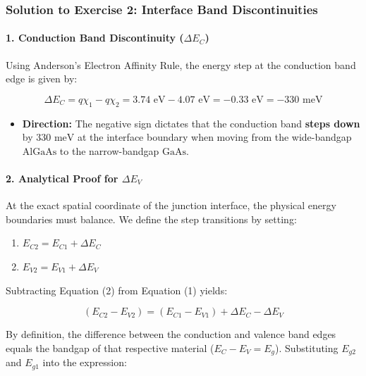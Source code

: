 \documentclass[
]{article}
\providecommand{\tightlist}{%
  \setlength{\itemsep}{0pt}\setlength{\parskip}{0pt}}
\begin{document}
\subsubsection{Solution to Exercise 2: Interface Band
Discontinuities}\label{solution-to-exercise-2-interface-band-discontinuities}

\paragraph{\texorpdfstring{1. Conduction Band Discontinuity
(\(\Delta E_C\))}{1. Conduction Band Discontinuity (\textbackslash Delta E\_C)}}\label{conduction-band-discontinuity-delta-e_c}

Using Anderson's Electron Affinity Rule, the energy step at the
conduction band edge is given by:

\[\Delta E_C = q\chi_1 - q\chi_2 = 3.74\text{ eV} - 4.07\text{ eV} = -0.33\text{ eV} = -330\text{ meV}\]

\begin{itemize}
\tightlist
\item
  \textbf{Direction:} The negative sign dictates that the conduction
  band \textbf{steps down} by \(330\text{ meV}\) at the interface
  boundary when moving from the wide-bandgap \(\text{AlGaAs}\) to the
  narrow-bandgap \(\text{GaAs}\).
\end{itemize}

\paragraph{\texorpdfstring{2. Analytical Proof for
\(\Delta E_V\)}{2. Analytical Proof for \textbackslash Delta E\_V}}\label{analytical-proof-for-delta-e_v}

At the exact spatial coordinate of the junction interface, the physical
energy boundaries must balance. We define the step transitions by
setting:

\begin{enumerate}
\def\labelenumi{\arabic{enumi}.}
\tightlist
\item
  \(E_{C2} = E_{C1} + \Delta E_C\)
\item
  \(E_{V2} = E_{V1} + \Delta E_V\)
\end{enumerate}

Subtracting Equation (2) from Equation (1) yields:

\[(E_{C2} - E_{V2}) = (E_{C1} - E_{V1}) + \Delta E_C - \Delta E_V\]

By definition, the difference between the conduction and valence band
edges equals the bandgap of that respective material
(\(E_{C} - E_{V} = E_g\)). Substituting \(E_{g2}\) and \(E_{g1}\) into
the expression:
\end{document}
